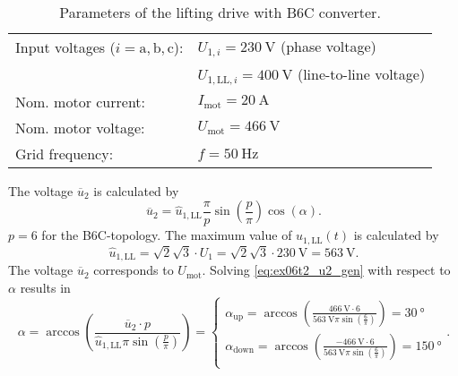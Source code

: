 \begin{table}[ht]
    \centering  %
    \begin{tabular}{ll}
        \toprule
        Input voltages ($i=\mathrm{a,b,c}$): & $U_{\mathrm{1},i}=\SI{230}{\volt}$ (phase voltage) \\
                        & $U_{\mathrm{1,LL},i} = \SI{400}{\volt}$ (line-to-line voltage)\\
        Nom. motor current: & $I_{\mathrm{mot}} = \SI{20}{\ampere}$ \\
        Nom. motor voltage: & $U_\mathrm{mot} = \SI{466}{\volt}$ \\ 
        Grid frequency: & $f= \SI{50}{\hertz}$ \\ 
        \bottomrule
    \end{tabular}
    \caption{Parameters of the lifting drive with B6C converter.}  
    \label{table:ex06_Task2_ParametersOfTheCircuit}
\end{table}


\begin{solutionblock}
    The voltage $\overline{u}_\mathrm{2}$ is calculated by
    \begin{equation} 
        \overline{u}_\mathrm{2} = \hat{u}_\mathrm{1,LL} \frac{\pi}{p}\sin(\frac{p}{\pi}) \cos(\alpha).
        \label{eq:ex06t2_u2_gen}
    \end{equation}
    $p=6$ for the B6C-topology. The maximum value of $u_\mathrm{1,LL}(t)$ is calculated by
    \begin{equation} 
        \hat{u}_\mathrm{1,LL}=\sqrt{2} \sqrt{3} \cdot U_\mathrm{1}= \sqrt{2} \sqrt{3} \cdot \SI{230}{\volt}=\SI{563}{\volt}.
        \label{eq:ex06t2_u1n_max}
    \end{equation}
    The voltage $\overline{u}_\mathrm{2}$ corresponds to $U_\mathrm{mot}$. Solving \eqref{eq:ex06t2_u2_gen} with respect to $\alpha$ results in
    \begin{equation} 
        \alpha = \arccos( \frac{\overline{u}_\mathrm{2} \cdot p}{\hat{u}_\mathrm{1,LL}\pi \sin(\frac{p}{\pi})}) =
        \begin{cases}
            \alpha_\mathrm{up} = \arccos( \frac{\SI{466}{\volt} \cdot 6}{\SI{563}{\volt}\pi \sin(\frac{6}{\pi})})=\SI{30}{\degree}     \\
            \alpha_\mathrm{down} = \arccos( \frac{\SI{-466}{\volt} \cdot 6}{\SI{563}{\volt}\pi \sin(\frac{6}{\pi})})=\SI{150}{\degree}    \\
        \end{cases}.
        \label{eq:ex06t2_alpha_gen}
    \end{equation}
\end{solutionblock}

